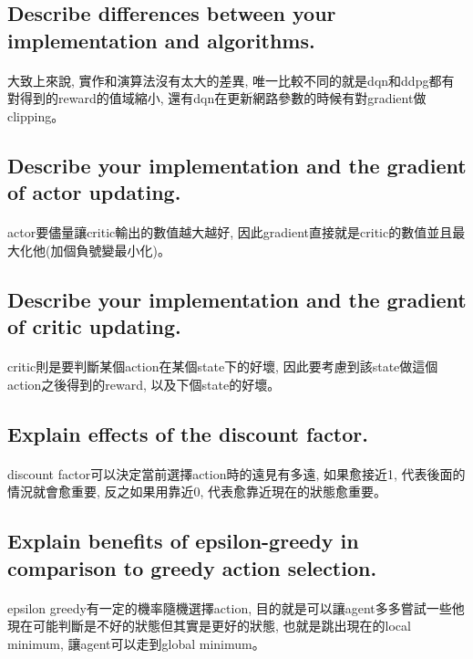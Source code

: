 \subsection{Describe differences between your implementation and algorithms.}
\paragraph{}
大致上來說, 實作和演算法沒有太大的差異, 唯一比較不同的就是dqn和ddpg都有對得到的reward的值域縮小, 還有dqn在更新網路參數的時候有對gradient做clipping。
\subsection{Describe your implementation and the gradient of actor updating.}
\paragraph{}
actor要儘量讓critic輸出的數值越大越好, 因此gradient直接就是critic的數值並且最大化他(加個負號變最小化)。
\subsection{Describe your implementation and the gradient of critic updating.}
\paragraph{}
critic則是要判斷某個action在某個state下的好壞, 因此要考慮到該state做這個action之後得到的reward, 以及下個state的好壞。
\subsection{Explain effects of the discount factor.}
\paragraph{}
discount factor可以決定當前選擇action時的遠見有多遠, 如果愈接近1, 代表後面的情況就會愈重要, 反之如果用靠近0, 代表愈靠近現在的狀態愈重要。
\subsection{Explain benefits of epsilon-greedy in comparison to greedy action selection.}
\paragraph{}
epsilon greedy有一定的機率隨機選擇action, 目的就是可以讓agent多多嘗試一些他現在可能判斷是不好的狀態但其實是更好的狀態, 也就是跳出現在的local minimum, 讓agent可以走到global minimum。
